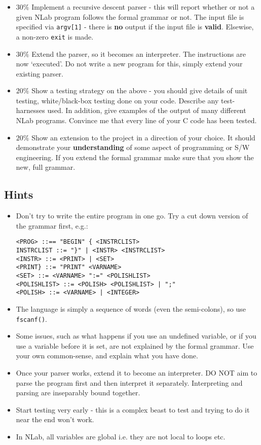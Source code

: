 \begin{exercise}
\begin{itemize}
\item {\bf $30\%$}
Implement a recursive descent parser - this will report
whether or not a given NLab program follows the formal grammar or not.
The input file is specified via \verb^argv[1]^ - there is {\bf no} output if
the input file is {\bf valid}. Elsewise, a non-zero \verb^exit^ is made.

\item {\bf $30\%$}
Extend the parser, so it becomes an interpreter. The instructions are
now `executed'. Do not write a new program for this, simply extend your
existing parser.

\item {\bf $20\%$}
Show a testing strategy on the above -
you should give details of
unit testing, white/black-box testing done on your code. Describe any
test-harnesses used. In addition, give examples of the output of many different
NLab programs. Convince me that every line of your C code
has been tested.

\item {\bf $20\%$}
Show an extension to the project in a direction of
your choice. It should demonstrate your {\bf understanding} of some aspect
of programming or S/W engineering. If you extend the formal grammar
make sure that you show the new, full grammar.
\end{itemize}

\subsection*{Hints}
\begin{itemize}
\item Don't try to write the entire program in one go. Try a cut
down version of the grammar first, e.g.:
\begin{verbatim}
<PROG> ::== "BEGIN" { <INSTRCLIST>
INSTRCLIST ::= "}" | <INSTR> <INSTRCLIST>
<INSTR> ::= <PRINT> | <SET>
<PRINT} ::= "PRINT" <VARNAME>
<SET> ::= <VARNAME> ":=" <POLISHLIST>
<POLISHLIST> ::= <POLISH> <POLISHLIST> | ";"
<POLISH> ::= <VARNAME> | <INTEGER>
\end{verbatim}
\item The language is simply a sequence of words (even the semi-colons),
so use \verb^fscanf()^.
\item Some issues, such as what happens if you use an undefined variable,
or if you use a variable before it is set, are not explained by the formal
grammar. Use your own common-sense, and explain what you have done.
\item Once your parser works, extend it to become an interpreter. DO NOT
aim to parse the program first and then interpret it separately. Interpreting
and parsing are inseparably bound together.
\item Start testing very early - this is a complex beast to test and trying to
do it near the end won't work.
\item In NLab, all variables are global i.e. they are not local to loops etc.
\end{itemize}


\end{exercise}
